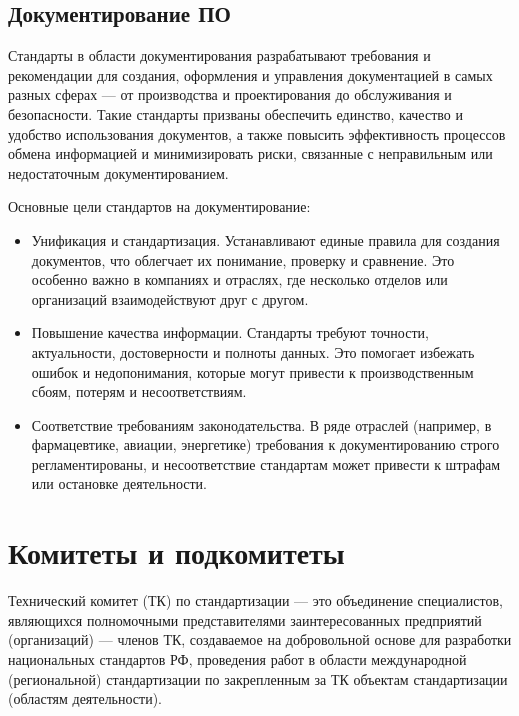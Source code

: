 \subsection{Документирование ПО}

Стандарты в области документирования разрабатывают требования
и рекомендации для создания, оформления
и управления документацией в самых разных сферах --- от производства
и проектирования до обслуживания и безопасности.
Такие стандарты призваны обеспечить единство,
качество и удобство использования документов,
а также повысить эффективность процессов обмена информацией
и минимизировать риски,
связанные с неправильным или недостаточным документированием.

Основные цели стандартов на документирование:

\begin{itemize}
	\item Унификация и стандартизация.
		Устанавливают единые правила для создания документов,
		что облегчает их понимание, проверку и сравнение.
		Это особенно важно в компаниях и отраслях,
		где несколько отделов или организаций взаимодействуют друг с другом.
	\item Повышение качества информации.
		Стандарты требуют точности, актуальности,
		достоверности и полноты данных.
		Это помогает избежать ошибок и недопонимания,
		которые могут привести к производственным сбоям,
		потерям и несоответствиям.
	\item Соответствие требованиям законодательства.
		В ряде отраслей (например, в фармацевтике, авиации, энергетике)
		требования к документированию строго регламентированы,
		и несоответствие стандартам может привести к штрафам
		или остановке деятельности.
\end{itemize}

\clearpage

\section{Комитеты и подкомитеты}

Технический комитет (ТК) по стандартизации --- это объединение специалистов,
являющихся полномочными представителями заинтересованных предприятий
(организаций) --- членов ТК,
создаваемое на добровольной основе для разработки национальных стандартов РФ,
проведения работ в области международной (региональной)
стандартизации по закрепленным за ТК объектам стандартизации
(областям деятельности).


